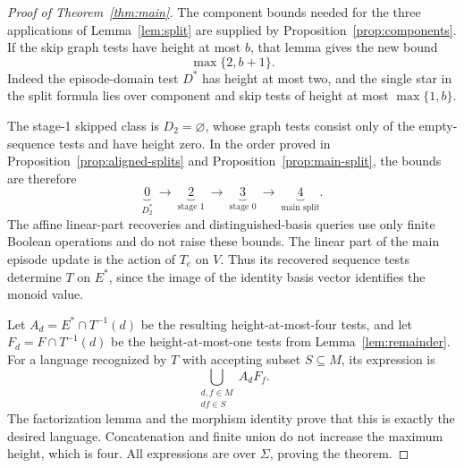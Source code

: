\begin{proof}[Proof of Theorem~\ref{thm:main}]
The component bounds needed for the three applications of
Lemma~\ref{lem:split} are supplied by
Proposition~\ref{prop:components}.  If the skip graph tests have height
at most $b$, that lemma gives the new bound
\[
 \max\{2,b+1\}.
\]
Indeed the episode-domain test $D^*$ has height at most two, and the
single star in the split formula lies over component and skip tests of
height at most $\max\{1,b\}$.

The stage-1 skipped class is $D_2=\varnothing$, whose graph tests consist
only of the empty-sequence tests and have height zero.  In the order
proved in Proposition~\ref{prop:aligned-splits} and
Proposition~\ref{prop:main-split}, the bounds are therefore
\[
 \underbrace{0}_{D_2^*}
 \ \longrightarrow\ 
 \underbrace{2}_{\text{stage 1}}
 \ \longrightarrow\ 
 \underbrace{3}_{\text{stage 0}}
 \ \longrightarrow\ 
 \underbrace{4}_{\text{main split}}.
\]
The affine linear-part recoveries and distinguished-basis queries use
only finite Boolean operations and do not raise these bounds.  The
linear part of the main episode update is the action of $T_e$ on $V$.
Thus its recovered sequence tests determine $T$ on $E^*$, since the
image of the identity basis vector identifies the monoid value.

Let $A_d=E^*\cap T^{-1}(d)$ be the resulting height-at-most-four tests,
and let $F_d=F\cap T^{-1}(d)$ be the height-at-most-one tests from
Lemma~\ref{lem:remainder}.  For a language recognized by $T$ with
accepting subset $S\subseteq M$, its expression is
\[
 \bigcup_{\substack{d,f\in M\\df\in S}} A_d F_f.
\]
The factorization lemma and the morphism identity prove that this is
exactly the desired language.  Concatenation and finite union do not
increase the maximum height, which is four.  All expressions are over
$\Sigma$, proving the theorem.
\end{proof}
